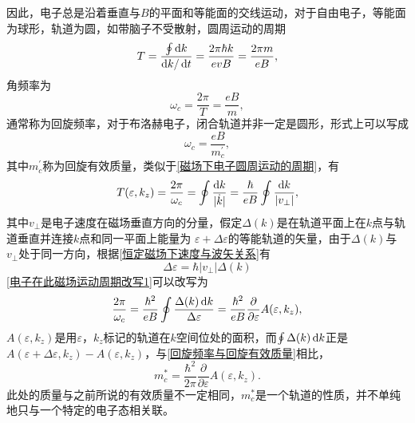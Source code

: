             因此，电子总是沿着垂直与$B$的平面和等能面的交线运动，对于自由电子，等能面为球形，轨道为圆，如带脑子不受散射，圆周运动的周期
            \begin{equation}
                T=\frac{\oint\mathop{}\!\mathrm{d} k}{\mathop{}\!\mathrm{d} k/\mathop{}\!\mathrm{d} t}=\frac{2\pi\hbar k}{evB}=\frac{2\pi m}{eB}\label{磁场下电子圆周运动的周期},
            \end{equation}
            角频率为
            \begin{equation}
                \omega_c=\frac{2\pi}{T}=\frac{eB}{m},
            \end{equation}
            通常称为回旋频率，对于布洛赫电子，闭合轨道并非一定是圆形，形式上可以写成
            \begin{equation}
                \omega_c=\frac{eB}{m^\prime_c}\label{回旋频率与回旋有效质量},
            \end{equation}
            其中$m^\prime_c$称为回旋有效质量，类似于\autoref{磁场下电子圆周运动的周期}，有
            \begin{equation}
                T(\varepsilon,k_z)=\frac{2\pi}{\omega_c}=\oint\frac{\mathop{}\!\mathrm{d} k}{|\dot{k}|}=\frac{\hbar}{eB}\oint\frac{\mathop{}\!\mathrm{d} k}{|v_\perp|}\label{电子在此磁场运动周期改写1},
            \end{equation}
            其中$v_\perp$是电子速度在磁场垂直方向的分量，假定$\Delta (k)$是在轨道平面上在$k$点与轨道垂直并连接$k$点和同一平面上能量为
            $\varepsilon+\Delta\varepsilon$的等能轨道的矢量，由于$\Delta (k)$与$v_\perp$处于同一方向，根据\autoref{恒定磁场下速度与波矢关系}有
            \begin{equation}
                \Delta \varepsilon=\hbar|v_\perp|\Delta(k)
            \end{equation}
            \autoref{电子在此磁场运动周期改写1}可以改写为
            \begin{equation}
                \frac{2\pi}{\omega_c}=\frac{\hbar^2}{eB}\oint\frac{\Delta(k)\mathop{}\!\mathrm{d} k}{\Delta\varepsilon}=\frac{\hbar^2}{eB}\frac{\partial}{\partial\varepsilon}A(\varepsilon,k_z),
            \end{equation}
            $A(\varepsilon,k_z)$是用$\varepsilon$，$k_z$标记的轨道在$k$空间位处的面积，而$\oint\Delta(k)\mathop{}\!\mathrm{d} k$正是
            $A(\varepsilon+\Delta\varepsilon,k_z)-A(\varepsilon,k_z)$，与\autoref{回旋频率与回旋有效质量}相比，
            \begin{equation}
                m_c^*=\frac{\hbar^2}{2\pi}\frac{\partial}{\partial\varepsilon}A(\varepsilon,k_z).
            \end{equation}
            此处的质量与之前所说的有效质量不一定相同，$m^*_c$是一个轨道的性质，并不单纯地只与一个特定的电子态相关联。

